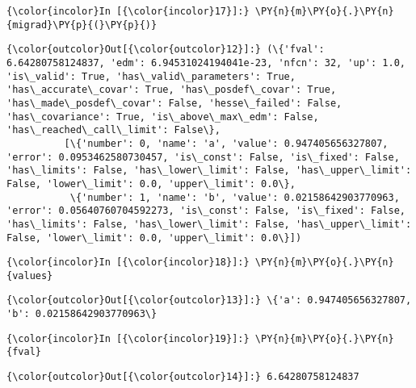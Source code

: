     \begin{Verbatim}[commandchars=\\\{\}]
{\color{incolor}In [{\color{incolor}17}]:} \PY{n}{m}\PY{o}{.}\PY{n}{migrad}\PY{p}{(}\PY{p}{)}
\end{Verbatim}


    
    
    
    
    
    
    
    
\begin{Verbatim}[commandchars=\\\{\}]
{\color{outcolor}Out[{\color{outcolor}12}]:} (\{'fval': 6.64280758124837, 'edm': 6.94531024194041e-23, 'nfcn': 32, 'up': 1.0, 'is\_valid': True, 'has\_valid\_parameters': True, 'has\_accurate\_covar': True, 'has\_posdef\_covar': True, 'has\_made\_posdef\_covar': False, 'hesse\_failed': False, 'has\_covariance': True, 'is\_above\_max\_edm': False, 'has\_reached\_call\_limit': False\},
          [\{'number': 0, 'name': 'a', 'value': 0.947405656327807, 'error': 0.0953462580730457, 'is\_const': False, 'is\_fixed': False, 'has\_limits': False, 'has\_lower\_limit': False, 'has\_upper\_limit': False, 'lower\_limit': 0.0, 'upper\_limit': 0.0\},
           \{'number': 1, 'name': 'b', 'value': 0.02158642903770963, 'error': 0.05640760704592273, 'is\_const': False, 'is\_fixed': False, 'has\_limits': False, 'has\_lower\_limit': False, 'has\_upper\_limit': False, 'lower\_limit': 0.0, 'upper\_limit': 0.0\}])
\end{Verbatim}
            
    \begin{Verbatim}[commandchars=\\\{\}]
{\color{incolor}In [{\color{incolor}18}]:} \PY{n}{m}\PY{o}{.}\PY{n}{values}
\end{Verbatim}


\begin{Verbatim}[commandchars=\\\{\}]
{\color{outcolor}Out[{\color{outcolor}13}]:} \{'a': 0.947405656327807, 'b': 0.02158642903770963\}
\end{Verbatim}
            
    \begin{Verbatim}[commandchars=\\\{\}]
{\color{incolor}In [{\color{incolor}19}]:} \PY{n}{m}\PY{o}{.}\PY{n}{fval}
\end{Verbatim}


\begin{Verbatim}[commandchars=\\\{\}]
{\color{outcolor}Out[{\color{outcolor}14}]:} 6.64280758124837
\end{Verbatim}
            
